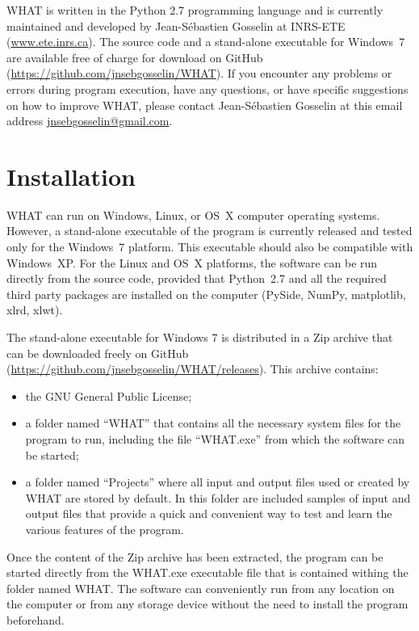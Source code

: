 \documentclass[WHATMANUAL.tex]{subfiles}
\begin{document}
WHAT is written in the Python 2.7 programming language and is currently maintained and developed by Jean-S\'ebastien Gosselin at INRS-ETE (\url{www.ete.inrs.ca}). The source code and a stand-alone executable for Windows 7 are available free of charge for download on GitHub (\url{https://github.com/jnsebgosselin/WHAT}). If you encounter any problems or errors during program execution, have any questions, or have specific suggestions on how to improve WHAT, please contact Jean-S\'ebastien Gosselin at this email address \href{mailto:jnsebgosselin@gmail.com}{jnsebgosselin@gmail.com}.

\newpage

\section{Installation}\label{sec:intallation}

WHAT can run on Windows, Linux, or OS X computer operating systems. However, a stand-alone executable of the program is currently released and tested only for the Windows 7 platform. This executable should also be compatible with Windows XP. For the Linux and OS X platforms, the software can be run directly from the source code, provided that Python 2.7 and all the required third party packages are installed on the computer (PySide, NumPy, matplotlib, xlrd, xlwt).

The stand-alone executable for Windows 7 is distributed in a Zip archive that can be downloaded freely on GitHub (\url{https://github.com/jnsebgosselin/WHAT/releases}). This archive contains:

\begin{itemize}

\item the GNU General Public License;

\item a folder named ``WHAT'' that contains all the necessary system files for the program to run, including the file ``WHAT.exe'' from which the software can be started;

\item a folder named ``Projects'' where all input and output files used or created by WHAT are stored by default. In this folder are included samples of input and output files that provide a quick and convenient way to test and learn the various features of the program.

\end{itemize}

Once the content of the Zip archive has been extracted, the program can be started directly from the WHAT.exe executable file that is contained withing the folder named WHAT. The software can conveniently run from any location on the computer or from any storage device without the need to install the program beforehand.
\end{document}

